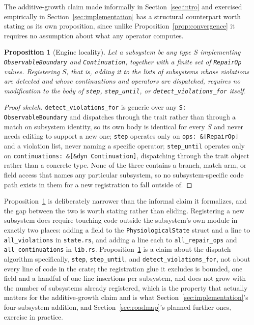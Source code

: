 \documentclass[11pt]{article}
\newtheorem{proposition}{Proposition}
\begin{document}
The additive-growth claim made informally in Section~\ref{sec:intro} and exercised empirically in Section~\ref{sec:implementation} has a structural counterpart worth stating as its own proposition, since unlike Proposition~\ref{prop:convergence} it requires no assumption about what any operator computes.

\begin{proposition}[Engine locality]
\label{prop:locality}
Let a subsystem be any type $S$ implementing \texttt{ObservableBoundary} and \texttt{Continuation}, together with a finite set of \texttt{RepairOp} values. Registering $S$, that is, adding it to the lists of subsystems whose violations are detected and whose continuations and operators are dispatched, requires no modification to the body of \texttt{step}, \texttt{step\_until}, or \texttt{detect\_violations\_for} itself.
\end{proposition}
\begin{proof}[Proof sketch]
\texttt{detect\_violations\_for} is generic over any \texttt{S: ObservableBoundary} and dispatches through the trait rather than through a match on subsystem identity, so its own body is identical for every $S$ and never needs editing to support a new one; \texttt{step} operates only on \texttt{ops: \&[RepairOp]} and a violation list, never naming a specific operator; \texttt{step\_until} operates only on \texttt{continuations: \&[\&dyn Continuation]}, dispatching through the trait object rather than a concrete type. None of the three contains a branch, match arm, or field access that names any particular subsystem, so no subsystem-specific code path exists in them for a new registration to fall outside of.
\end{proof}
Proposition~\ref{prop:locality} is deliberately narrower than the informal claim it formalizes, and the gap between the two is worth stating rather than eliding. Registering a new subsystem does require touching code outside the subsystem's own module in exactly two places: adding a field to the \texttt{PhysiologicalState} struct and a line to \texttt{all\_violations} in \texttt{state.rs}, and adding a line each to \texttt{all\_repair\_ops} and \texttt{all\_continuations} in \texttt{lib.rs}. Proposition~\ref{prop:locality} is a claim about the dispatch algorithm specifically, \texttt{step}, \texttt{step\_until}, and \texttt{detect\_violations\_for}, not about every line of code in the crate; the registration glue it excludes is bounded, one field and a handful of one-line insertions per subsystem, and does not grow with the number of subsystems already registered, which is the property that actually matters for the additive-growth claim and is what Section~\ref{sec:implementation}'s four-subsystem addition, and Section~\ref{sec:roadmap}'s planned further ones, exercise in practice.
\end{document}
